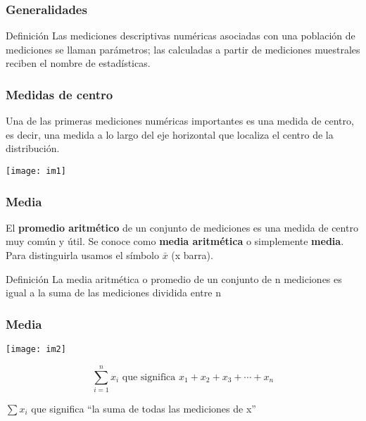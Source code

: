 \documentclass[spanish]{beamer}
\begin{document}
\begin{frame}
\frametitle{Generalidades} 
\begin{block}{Definición}
Las mediciones descriptivas numéricas asociadas con una población de
mediciones se llaman parámetros; las calculadas a partir de mediciones muestrales reciben el nombre de estadísticas.
\end{block}
\end{frame}
\begin{frame}
\frametitle{Medidas de centro} 
Una de las primeras mediciones numéricas importantes es
una medida de centro, es decir, una medida a lo largo del eje horizontal que localiza el centro de la distribución.

\begin{center}
\texttt{[image: im1]}
\end{center}
\end{frame}
\begin{frame}
\frametitle{Media} 
El \textbf{promedio aritmético} de un conjunto de mediciones es una medida de centro muy común y útil. Se conoce como \textbf{media aritmética} o simplemente \textbf{media}. Para distinguirla usamos el símbolo $\bar{x}$ (x barra).



\begin{block}{Definición}
La media aritmética o promedio de un conjunto de n mediciones es
igual a la suma de las mediciones dividida entre n
\end{block}

\end{frame}
\begin{frame}
\frametitle{Media} 
\begin{center}
\texttt{[image: im2]}
\end{center}

\begin{equation*}
\sum_{i=1}^{n}{x_{i}} \text{  que significa } x_{1}+x_{2}+x_{3}+\cdots + x_{n}
\end{equation*}

$\sum {x_{i}}$ que significa “la suma de todas las mediciones de x”
\end{frame}
\end{document}
